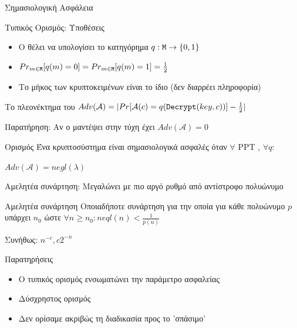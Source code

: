 \documentclass[handout]{beamer}
\begin{document}
\begin{frame}[allowframebreaks]{Σημασιολογική Ασφάλεια}
\framebreak

Τυπικός Ορισμός: Υποθέσεις
\begin{itemize}
\item O \adv θέλει να υπολογίσει το κατηγόρημα $q: \mathtt{M} \rightarrow \{0,1\}$
\item $Pr_{m \in \mathtt{M}}[q(m)=0]=Pr_{m \in \mathtt{M}}[q(m)=1]=\frac{1}{2}$
\item Το μήκος των κρυπτοκειμένων είναι το ίδιο (δεν διαρρέει πληροφορία)
\end{itemize}

\begin{block}{Το πλεονέκτημα του \adv}
$Adv(\mathcal{A}) = |Pr[\mathcal{A}(c)=q(\mathtt{Decrypt}(key,c))]-\frac{1}{2}|$
\end{block}

Παρατήρηση: Αν ο \adv μαντέψει στην τύχη έχει $Adv(\mathcal{A})=0$
\framebreak

\begin{block}{Ορισμός}
Ένα κρυπτοσύστημα είναι σημασιολογικά ασφαλές όταν $\forall$ PPT \adv, $\forall q$:
\begin{center}
$Adv(\mathcal{A})=negl(\lambda)$
\end{center}
\end{block}

Αμελητέα συνάρτηση: Μεγαλώνει με πιο αργό ρυθμό από αντίστροφο πολυώνυμο

\framebreak

\begin{block}{Αμελητέα συνάρτηση}
Οποιαδήποτε συνάρτηση για την οποία για κάθε πολυώνυμο $p$ υπάρχει $n_0$ ώστε $\forall n \geq n_0: neql(n)<\frac{1}{p(n)}$
\end{block}

Συνήθως: $n^{-c}, c2^{-n}$
 
\begin{block}{Παρατηρήσεις}
\begin{itemize}
\item Ο τυπικός ορισμός ενσωματώνει την παράμετρο ασφαλείας
\item Δύσχρηστος ορισμός
\item Δεν ορίσαμε ακριβώς τη διαδικασία προς το 'σπάσιμο'
\end{itemize}
\end{block}
\end{frame}
\end{document}
